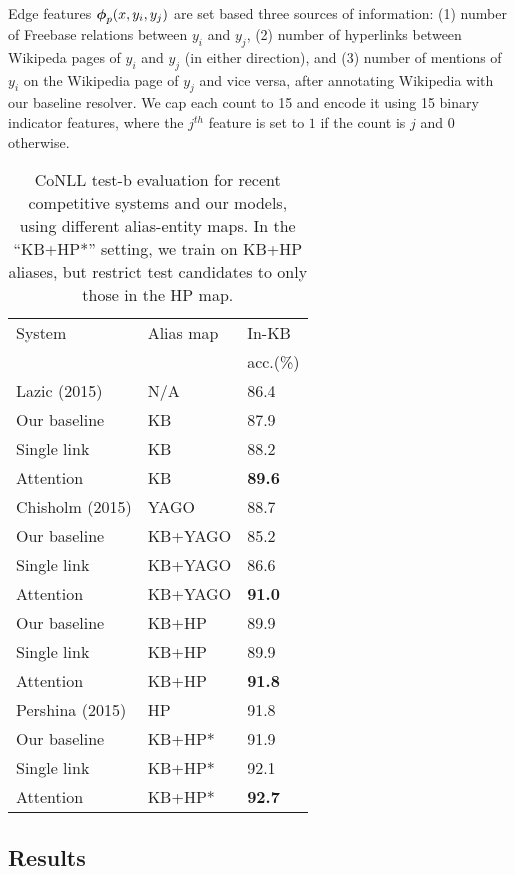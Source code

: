 {Edge features} $\boldsymbol{\phi}_p(x,y_i,y_j)$ are set based three sources of information: (1) number of Freebase relations between $y_i$ and $y_j$, (2) number of hyperlinks between Wikipeda pages of $y_i$ and $y_j$ (in either direction), and
(3) number of mentions of $y_i$ on the Wikipedia page of $y_j$ and vice versa, after
annotating  Wikipedia with our baseline resolver. 
We cap each count to 15 and encode it using 15 binary indicator features,
where the $j^{th}$ feature is set to $1$ if the count is $j$ and $0$ otherwise.


\begin{table}[t!]
  \centering
  \begin{tabular}{l|l|l}
    System                 &  Alias map  & In-KB  \\
    & & acc.(\%) \\
    \hline
    Lazic (2015)    & N/A          & 86.4 \\
    \hline
    Our baseline    & KB           & 87.9  \\
    Single link     & KB           & 88.2 \\
    Attention       & KB           & \textbf{89.6} \\
    \hline
        Chisholm (2015) & YAGO         & 88.7 \\ 
    Our baseline    & KB+YAGO      & 85.2 \\
    Single link     & KB+YAGO      & 86.6 \\
    Attention       & KB+YAGO      & {\bf 91.0} \\
    \hline
    Our baseline    & KB+HP        & 89.9 \\
    Single link & KB+HP & 89.9 \\
    Attention       & KB+HP        & {\bf 91.8} \\
    \hline
        Pershina (2015) & HP           & 91.8 \\
    Our baseline &KB+HP* & 91.9 \\
    Single link     & KB+HP*       & 92.1 \\
    Attention       & KB+HP*       & {\bf 92.7} 
  \end{tabular}
\caption{CoNLL test-b evaluation for recent competitive systems and
  our models, using different alias-entity maps.  In the ``KB+HP*''
  setting, we train on KB+HP aliases, but restrict test candidates to
  only those in the HP map.}
 \label{table:conll_results} 
\end{table}

\subsection{Results}

